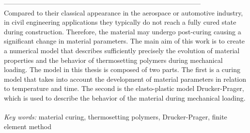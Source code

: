 --------------------------------------------------------------------------------------- \\

Compared to their classical appearance in the aerospace or automotive industry, in civil engineering applications they typically do not reach a fully cured state during construction. Therefore, the material may undergo post-curing causing a significant change in material parameters. The main aim of this work is to create a numerical model that describes sufficiently precisely the evolution of material properties and the behavior of thermosetting polymers during mechanical loading. The model in this thesis is composed of two parts. The first is a curing model that takes into account the development of material parameters in relation to temperature and time. The second is the elasto-plastic model Drucker-Prager, which is used to describe the behavior of the material during mechanical loading.
\\
\\

\noindent 
{\it Key words:} material curing, thermosetting polymers, Drucker-Prager, finite element method

%
